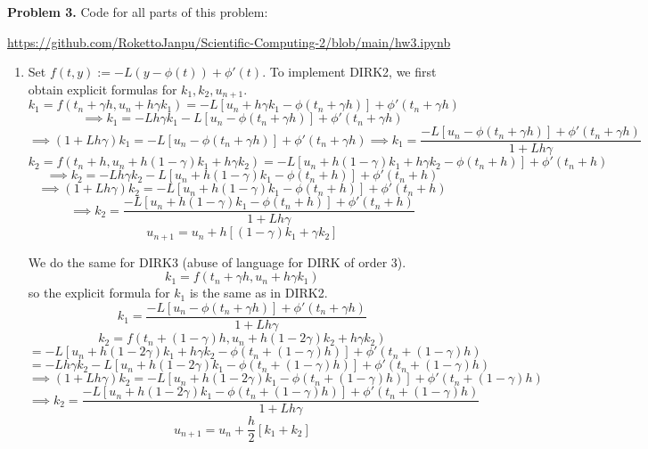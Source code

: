 \documentclass{article}
\def\tbf#1{\textbf{#1}}
\newcommand{\sbr}[1]{\left[#1\right]}
\newcommand{\imp}{\implies}
\begin{document}
\tbf{Problem 3.} Code for all parts of this problem:

\url{https://github.com/RokettoJanpu/Scientific-Computing-2/blob/main/hw3.ipynb}

\begin{enumerate}[label=(\alph*)]
	
\item Set $f(t,y):=-L(y-\phi(t))+\phi'(t)$. To implement DIRK2, we first obtain explicit formulas for $k_1,k_2,u_{n+1}$.
$$k_1 = f(t_n+\gamma h,u_n+h\gamma k_1)
= -L\sbr{u_n+h\gamma k_1-\phi(t_n+\gamma h)}+\phi'(t_n+\gamma h)$$
$$\imp k_1 = -Lh\gamma k_1-L\sbr{u_n-\phi(t_n+\gamma h)}+\phi'(t_n+\gamma h)$$
$$\imp (1+Lh\gamma)k_1 = -L\sbr{u_n-\phi(t_n+\gamma h)}+\phi'(t_n+\gamma h)
\imp k_1 = \frac{-L\sbr{u_n-\phi(t_n+\gamma h)}+\phi'(t_n+\gamma h)}{1+Lh\gamma}$$
$$k_2 = f(t_n+h,u_n+h(1-\gamma)k_1+h\gamma k_2) = -L\sbr{u_n+h(1-\gamma)k_1+h\gamma k_2-\phi(t_n+h)}+\phi'(t_n+h)$$
$$\imp k_2 = -Lh\gamma k_2-L\sbr{u_n+h(1-\gamma)k_1-\phi(t_n+h)}+\phi'(t_n+h)$$
$$\imp (1+Lh\gamma)k_2 = -L\sbr{u_n+h(1-\gamma)k_1-\phi(t_n+h)}+\phi'(t_n+h)$$
$$\imp k_2 = \frac{-L\sbr{u_n+h(1-\gamma)k_1-\phi(t_n+h)}+\phi'(t_n+h)}{1+Lh\gamma}$$
$$u_{n+1} = u_n+h\sbr{(1-\gamma)k_1+\gamma k_2}$$

We do the same for DIRK3 (abuse of language for DIRK of order 3).
$$k_1 = f(t_n+\gamma h,u_n+h\gamma k_1)$$
so the explicit formula for $k_1$ is the same as in DIRK2.
$$k_1 = \frac{-L\sbr{u_n-\phi(t_n+\gamma h)}+\phi'(t_n+\gamma h)}{1+Lh\gamma}$$
$$k_2 = f(t_n+(1-\gamma)h,u_n+h(1-2\gamma)k_2+h\gamma k_2)$$
$$= -L\sbr{u_n+h(1-2\gamma)k_1+h\gamma k_2-\phi(t_n+(1-\gamma)h)}+\phi'(t_n+(1-\gamma)h)$$
$$= -Lh\gamma k_2-L\sbr{u_n+h(1-2\gamma)k_1-\phi(t_n+(1-\gamma)h)}+\phi'(t_n+(1-\gamma)h)$$
$$\imp (1+Lh\gamma)k_2 = -L\sbr{u_n+h(1-2\gamma)k_1-\phi(t_n+(1-\gamma)h)}+\phi'(t_n+(1-\gamma)h)$$
$$\imp k_2 = \frac{-L\sbr{u_n+h(1-2\gamma)k_1-\phi(t_n+(1-\gamma)h)}+\phi'(t_n+(1-\gamma)h)}{1+Lh\gamma}$$
$$u_{n+1} = u_n+\frac h2[k_1+k_2]$$



\end{enumerate}
\end{document}
